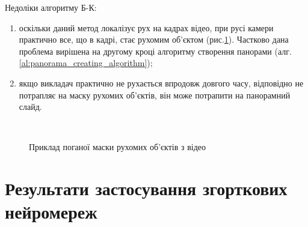 Недоліки алгоритму Б-К:
\begin{enumerate}
    \item оскільки даний метод локалізує рух на кадрах відео,
          при русі камери практично все, що в кадрі, стає рухомим об'єктом
          (рис.\ref{fig:bk_bad_mask}).
          Частково дана проблема вирішена на другому кроці алгоритму створення панорами
          (алг. \ref{al:panorama_creating_algorithm});
    \item якщо викладач практично не рухається впродовж довгого часу, відповідно не потрапляє
          на маску рухомих об'єктів, він може потрапити на панорамний слайд.
\end{enumerate}

\begin{figure}[H]
    \centering

     \\
    \caption{Приклад поганої маски рухомих об'єктів з відео \cite{dorohovtsev_video}
        \label{fig:bk_bad_mask}
    }
\end{figure}

\section{Результати застосування згорткових нейромереж}

